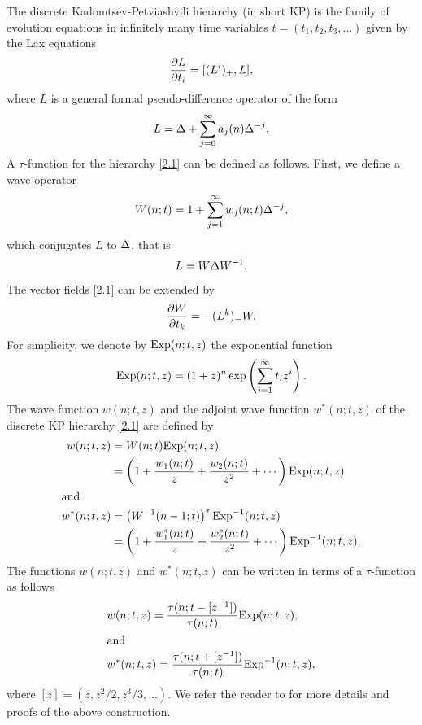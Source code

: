 \documentclass[11pt,reqno]{amsart}
\theoremstyle{definition}
\numberwithin{equation}{section}
\begin{document}
The discrete Kadomtsev-Petviashvili hierarchy (in short KP) 
is the family of evolution equations in 
infinitely many time variables $t=(t_1,t_2,t_3,\dotsc)$ given by 
the Lax equations
\begin{equation}                                                \label{2.1}
\frac{\partial L}{\partial t_i}=[(L^i)_+,L],
\end{equation}
where $L$ is a general formal pseudo-difference operator of the form
\begin{equation*}
L=\Delta+\sum_{j=0}^{\infty}a_j(n)\Delta^{-j}.
\end{equation*}
A $\tau$-function for the hierarchy \eqref{2.1} can be defined as follows. 
First, we define a wave operator 
\begin{equation*}
W(n;t)=1+\sum_{j=1}^{\infty}w_j(n;t)\Delta^{-j},
\end{equation*}
which conjugates $L$ to $\Delta$, that is
\begin{equation}                                                \label{2.2}
L=W\Delta W^{-1}.
\end{equation}
The vector fields \eqref{2.1} can be extended by 
\begin{equation}                                                \label{2.3}
\frac{\partial W}{\partial t_k}=-(L^k)_-W.
\end{equation}
For simplicity, we denote by ${\mathrm{Exp}}(n;t,z)$ the exponential function 
\begin{equation*}
{\mathrm{Exp}}(n;t,z)= (1+z)^n\exp\left(\sum_{i=1}^{\infty}t_iz^i\right).
\end{equation*}
The wave function $w(n;t,z)$ and the adjoint wave function 
$w^*(n;t,z)$ of the discrete KP hierarchy \eqref{2.1} are defined by
\begin{subequations}\label{2.4}
\begin{align}
w(n;t,z)&=W(n;t){\mathrm{Exp}}(n;t,z)\nonumber\\
&=\left(1+\frac{w_1(n;t)}{z}+\frac{w_2(n;t)}{z^2}+\dotsb\right){\mathrm{Exp}}(n;t,z)
                                                                \label{2.4a}\\
\intertext{and}
w^*(n;t,z)&=\left(W^{-1}(n-1;t)\right)^*{\mathrm{Exp}}^{-1}(n;t,z)\nonumber\\
&=\left(1+\frac{w^*_1(n;t)}{z}+\frac{w^*_2(n;t)}{z^2}+\dotsb\right){\mathrm{Exp}}^{-1}(n;t,z).
                                                                \label{2.4b}
\end{align}
\end{subequations}
The functions $w(n;t,z)$ and $w^*(n;t,z)$ can be written in terms of a 
$\tau$-function as follows
\begin{subequations}\label{2.5}
\begin{align}
&w(n;t,z)=\frac{\tau(n;t-[z^{-1}])}{\tau(n;t)}{\mathrm{Exp}}(n;t,z),            \label{2.5a}\\
\intertext{and}
&w^*(n;t,z)=\frac{\tau(n;t+[z^{-1}])}{\tau(n;t)}{\mathrm{Exp}}^{-1}(n;t,z),          \label{2.5b}
\end{align}
\end{subequations}
where $[z]=(z,z^2/2,z^3/3,\dotsc)$. We refer the reader to \cite{HI} for 
more details and proofs of the above construction. 
\end{document}
